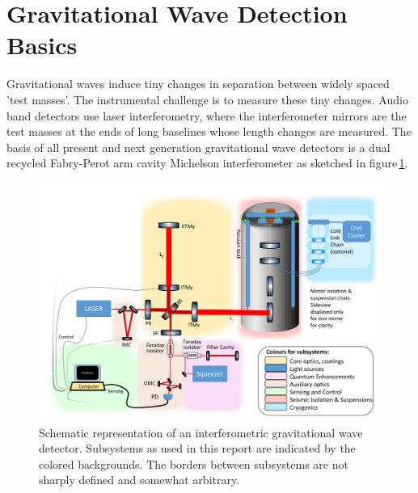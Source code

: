 

\section{Gravitational Wave Detection Basics}
Gravitational waves induce tiny changes in separation between widely spaced 'test masses'. The instrumental challenge is to measure these tiny changes. Audio band detectors use laser interferometry, where the interferometer mirrors are the test masses at the ends of long baselines whose length changes are measured. The basis of all present and next generation gravitational wave detectors is a dual recycled Fabry-Perot arm cavity Michelson interferometer as sketched in figure\,\ref{fig:ifo_layout}. 
\begin{figure}[ht]
\includegraphics*[width=\textwidth]{Figures/InterferometerSchematicSubsystemColourSAS.pdf}
\caption{Schematic representation of an interferometric gravitational wave detector. Subsystems as used in this report are indicated by the colored backgrounds. The borders between subsystems are not sharply defined and somewhat arbitrary.}
\label{fig:ifo_layout}
\end{figure}

